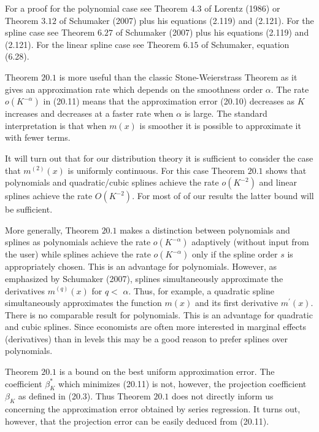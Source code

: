 \documentclass[10pt]{article}
\begin{document}
For a proof for the polynomial case see Theorem $4.3$ of Lorentz (1986) or Theorem $3.12$ of Schumaker (2007) plus his equations (2.119) and (2.121). For the spline case see Theorem $6.27$ of Schumaker (2007) plus his equations (2.119) and (2.121). For the linear spline case see Theorem $6.15$ of Schumaker, equation (6.28).

Theorem $20.1$ is more useful than the classic Stone-Weierstrass Theorem as it gives an approximation rate which depends on the smoothness order $\alpha$. The rate $o\left(K^{-\alpha}\right)$ in (20.11) means that the approximation error (20.10) decreases as $K$ increases and decreases at a faster rate when $\alpha$ is large. The standard interpretation is that when $m(x)$ is smoother it is possible to approximate it with fewer terms.

It will turn out that for our distribution theory it is sufficient to consider the case that $m^{(2)}(x)$ is uniformly continuous. For this case Theorem $20.1$ shows that polynomials and quadratic/cubic splines achieve the rate $o\left(K^{-2}\right)$ and linear splines achieve the rate $O\left(K^{-2}\right)$. For most of of our results the latter bound will be sufficient.

More generally, Theorem $20.1$ makes a distinction between polynomials and splines as polynomials achieve the rate $o\left(K^{-\alpha}\right)$ adaptively (without input from the user) while splines achieve the rate $o\left(K^{-\alpha}\right)$ only if the spline order $s$ is appropriately chosen. This is an advantage for polynomials. However, as emphasized by Schumaker (2007), splines simultaneously approximate the derivatives $m^{(q)}(x)$ for $q<$ $\alpha$. Thus, for example, a quadratic spline simultaneously approximates the function $m(x)$ and its first derivative $m^{\prime}(x)$. There is no comparable result for polynomials. This is an advantage for quadratic and cubic splines. Since economists are often more interested in marginal effects (derivatives) than in levels this may be a good reason to prefer splines over polynomials.

Theorem $20.1$ is a bound on the best uniform approximation error. The coefficient $\beta_{K}^{*}$ which minimizes (20.11) is not, however, the projection coefficient $\beta_{K}$ as defined in (20.3). Thus Theorem $20.1$ does not directly inform us concerning the approximation error obtained by series regression. It turns out, however, that the projection error can be easily deduced from (20.11).
\end{document}
